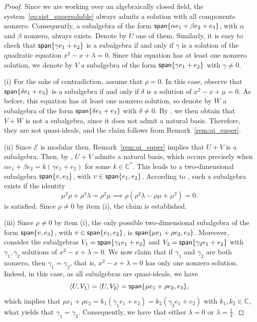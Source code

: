 \documentclass[12pt,reqno]{amsart}
\theoremstyle{plain}%
\theoremstyle{definition}
\theoremstyle{remark}
\newcommand{\E}{\mathcal{E}}
\DeclareMathOperator{\spa}{\textup{\textsf{span}}}
\numberwithin{equation}{section}
\begin{document}
\begin{proof}
Since we are working over an algebraically closed field, the system~\eqref{eq:sist_supersoluble} always admits a solution with all components nonzero. Consequently, a subalgebra of the form $\spa\{\alpha e_1+\beta e_2+e_3\}$, with $\alpha$ and $\beta$ nonzero, always exists. Denote by $U$ one of them. Similarly, it is easy to check that $\spa\{\gamma e_1+e_2\}$ is a subalgebra if and only if $\gamma$ is a solution of the quadratic equation $x^2-x+\lambda=0$. Since this equation has at least one nonzero solution, we denote by $V$ a subalgebra of the form $\spa\{\gamma e_1+e_2\}$ with $\gamma\neq0$.

(i) For the sake of contradiction, assume that $\rho=0$. In this case, observe that $\spa\{\delta e_1+e_3\}$ is a subalgebra if and only if $\delta$ is a solution of $x^2-x+\mu=0$. As before, this equation has at least one nonzero solution, so denote by $W$ a subalgebra of the form $\spa\{\delta e_1+e_3\}$ with $\delta\neq0$.  By \cite[Theorem~2]{LP_25_regular}, we then obtain that $V+W$ is not a subalgebra, since it does not admit a natural basis. Therefore, they are not quasi-ideals, and the claim follows from Remark~\ref{rem:qi_super}.

(ii) Since $\E$ is modular then, Remark~\ref{rem:qi_super} implies that $U+V$ is a subalgebra. Then, by \cite[Theorem~2]{LP_25_regular},  $U+V$  admits a natural basis, which occurs precisely when  $\alpha e_1+\beta e_2=k(\gamma e_1+e_2)$ for some $k\in\mathbb{C}^*$.
This leads to a two-dimensional
subalgebra $\spa\{v,e_3\}$, with $v\in\spa\{e_1,e_2\}$. According to \cite[Corollary~7]{LP_25_regular}, such a subalgebra exists if the identity 
\[\mu^2\rho+\rho^3\lambda=\rho^2\mu\implies\rho(\rho^2\lambda-\rho\mu+\mu^2)=0.\] 
is satisfied. Since $\rho\neq0$ by item (i), the claim is established.

(iii) Since $\rho\neq0$ by item (i), the only possible two-dimensional subalgebra of the form $\spa\{v,e_3\}$, with $v\in\spa\{e_1,e_2\}$, is $\spa\{\mu e_1+\rho e_2,e_3\}$. Moreover, consider the subalgebras $V_1=\spa\{\gamma_1e_1+e_2\}$ and $V_2=\spa\{\gamma_2e_1+e_2\}$ with $\gamma_1,\gamma_2$ solutions of $x^2-x+\lambda=0$. We now claim that if $\gamma_1$ and $\gamma_2$ are both nonzero, then $\gamma_1=\gamma_2$, that is, $x^2-x+\lambda=0$ has only one nonzero solution. Indeed, in this case, as all subalgebras are quasi-ideals, we have
\[\langle U, V_1\rangle=\langle U, V_2\rangle=\spa\{\mu e_1+\rho e_2,e_3\},\] 
which implies that $\mu e_1+\rho e_2=k_1(\gamma_1e_1+e_2)=k_2(\gamma_2e_1+e_2)$ with $k_1,k_2\in\mathbb{C}$, what yields that $\gamma_1=\gamma_2$. Consequently, we have that either $\lambda=0$ or $\lambda=\frac{1}{4}$.


\end{proof}
\end{document}
